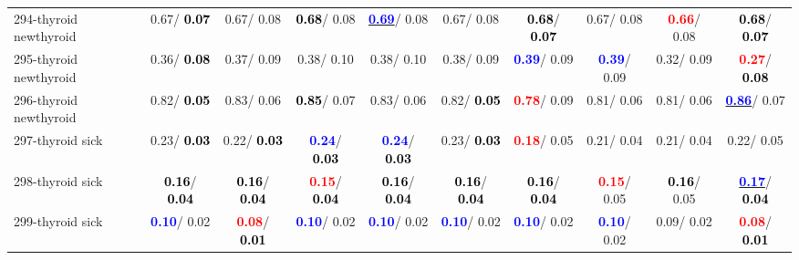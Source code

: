 \begin{table}[h]
\begin{center}
{\begin{tabular}{lc|c|c|c|c|c|c|c|c}
294-thyroid newthyroid &   0.67/\textcolor{black}{\textbf{  0.07}} &   0.67/  0.08 & \textcolor{black}{\textbf{  0.68}}/  0.08 & \underline{\textcolor{blue}{\textbf{  0.69}}}/  0.08 &   0.67/  0.08 & \textcolor{black}{\textbf{  0.68}}/\textcolor{black}{\textbf{  0.07}} &   0.67/  0.08 & \textcolor{red}{\textbf{  0.66}}/  0.08 & \textcolor{black}{\textbf{  0.68}}/\textcolor{black}{\textbf{  0.07}} \\
295-thyroid newthyroid &   0.36/\textcolor{black}{\textbf{  0.08}} &   0.37/  0.09 &   0.38/  0.10 &   0.38/  0.10 &   0.38/  0.09 & \textcolor{blue}{\textbf{  0.39}}/  0.09 & \textcolor{blue}{\textbf{  0.39}}/  0.09 &   0.32/  0.09 & \textcolor{red}{\textbf{  0.27}}/\textcolor{black}{\textbf{  0.08}} \\ \hline
296-thyroid newthyroid &   0.82/\textcolor{black}{\textbf{  0.05}} &   0.83/  0.06 & \textcolor{black}{\textbf{  0.85}}/  0.07 &   0.83/  0.06 &   0.82/\textcolor{black}{\textbf{  0.05}} & \textcolor{red}{\textbf{  0.78}}/  0.09 &   0.81/  0.06 &   0.81/  0.06 & \underline{\textcolor{blue}{\textbf{  0.86}}}/  0.07 \\
297-thyroid sick &   0.23/\textcolor{black}{\textbf{  0.03}} &   0.22/\textcolor{black}{\textbf{  0.03}} & \textcolor{blue}{\textbf{  0.24}}/\textcolor{black}{\textbf{  0.03}} & \textcolor{blue}{\textbf{  0.24}}/\textcolor{black}{\textbf{  0.03}} &   0.23/\textcolor{black}{\textbf{  0.03}} & \textcolor{red}{\textbf{  0.18}}/  0.05 &   0.21/  0.04 &   0.21/  0.04 &   0.22/  0.05 \\
298-thyroid sick & \textcolor{black}{\textbf{  0.16}}/\textcolor{black}{\textbf{  0.04}} & \textcolor{black}{\textbf{  0.16}}/\textcolor{black}{\textbf{  0.04}} & \textcolor{red}{\textbf{  0.15}}/\textcolor{black}{\textbf{  0.04}} & \textcolor{black}{\textbf{  0.16}}/\textcolor{black}{\textbf{  0.04}} & \textcolor{black}{\textbf{  0.16}}/\textcolor{black}{\textbf{  0.04}} & \textcolor{black}{\textbf{  0.16}}/\textcolor{black}{\textbf{  0.04}} & \textcolor{red}{\textbf{  0.15}}/  0.05 & \textcolor{black}{\textbf{  0.16}}/  0.05 & \underline{\textcolor{blue}{\textbf{  0.17}}}/\textcolor{black}{\textbf{  0.04}} \\
299-thyroid sick & \textcolor{blue}{\textbf{  0.10}}/  0.02 & \textcolor{red}{\textbf{  0.08}}/\textcolor{black}{\textbf{  0.01}} & \textcolor{blue}{\textbf{  0.10}}/  0.02 & \textcolor{blue}{\textbf{  0.10}}/  0.02 & \textcolor{blue}{\textbf{  0.10}}/  0.02 & \textcolor{blue}{\textbf{  0.10}}/  0.02 & \textcolor{blue}{\textbf{  0.10}}/  0.02 &   0.09/  0.02 & \textcolor{red}{\textbf{  0.08}}/\textcolor{black}{\textbf{  0.01}} \\

\end{tabular}}
\end{center}
\end{table}
